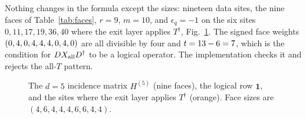 Nothing changes in the formula except the sizes: nineteen data sites, the nine faces of Table~\ref{tab:faces}, $r=9$, $m=10$, and $\epsilon_q=-1$ on the six sites $0,11,17,19,36,40$ where the exit layer applies $T^\dagger$, Fig.~\ref{fig:dfive}. The signed face weights $(0,4,0,4,4,4,0,4,0)$ are all divisible by four and $t=13-6=7$, which is the condition for $DX_{\rm all}D^\dagger$ to be a logical operator. The implementation checks it and rejects the all-$T$ pattern.

\begin{figure}[H]\centering
{}
\caption{The $d=5$ incidence matrix $H^{(5)}$ (nine faces), the logical row $\boldsymbol1$, and the sites where the exit layer applies $T^\dagger$ (orange). Face sizes are $(4,6,4,4,4,6,6,4,4)$.}
\label{fig:dfive}
\end{figure}
